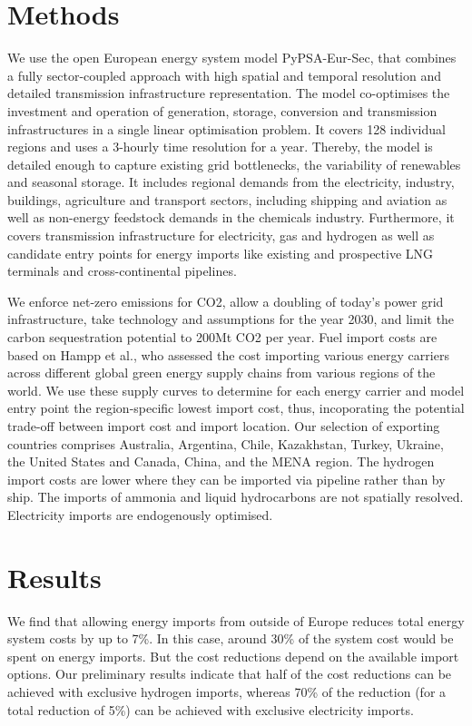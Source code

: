 \documentclass[10pt,5p,reversenotenum,lefttitle]{elsarticle}
\begin{document}
\section*{Methods}

We use the open European energy system model PyPSA-Eur-Sec, that combines a
fully sector-coupled approach with high spatial and temporal resolution and
detailed transmission infrastructure representation. The model co-optimises the
investment and operation of generation, storage, conversion and transmission
infrastructures in a single linear optimisation problem. It covers 128
individual regions and uses a 3-hourly time resolution for a year. Thereby, the
model is detailed enough to capture existing grid bottlenecks, the
variability of renewables and seasonal storage. It
includes regional demands from the electricity, industry, buildings, agriculture
and transport sectors, including shipping and aviation as well as non-energy
feedstock demands in the chemicals industry. Furthermore, it covers
transmission infrastructure for electricity, gas and hydrogen as well as
candidate entry points for energy imports like existing and prospective LNG
terminals and cross-continental pipelines. 

We enforce net-zero emissions for CO2, allow a
doubling of today's power grid infrastructure, take technology and assumptions
for the year 2030, and limit the carbon sequestration potential to 200Mt CO2
per year. Fuel import costs are based on Hampp et al., who assessed the cost importing various energy carriers across
different global green energy supply chains from various regions of the world. 
We use these supply curves to determine for each energy carrier and model entry
point the region-specific lowest import cost, thus, incoporating the potential
trade-off between import cost and import location.
Our selection of exporting countries comprises Australia, Argentina, Chile,
Kazakhstan, Turkey, Ukraine, the United States and Canada, China, and the MENA region. The hydrogen import costs are lower where they can be imported via pipeline
rather than by ship. The imports of ammonia and liquid hydrocarbons are not
spatially resolved. Electricity imports are endogenously optimised.

\section*{Results}

We find that allowing energy imports from outside of Europe reduces total energy
system costs by up to 7\%. In this case, around 30\% of the system cost would be
spent on energy imports. But the cost reductions depend on the available import
options. Our preliminary results indicate that half of the cost reductions can
be achieved with exclusive hydrogen imports, whereas 70\% of the reduction (for
a total reduction of 5\%) can be achieved with exclusive electricity imports.
\end{document}
